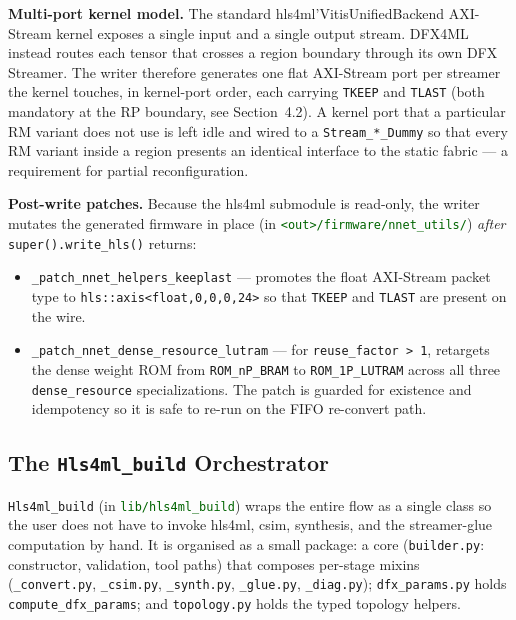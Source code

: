 \documentclass{cernatsnote}
\begin{document}
\noindent\textbf{Multi-port kernel model.}
The standard hls4ml'VitisUnifiedBackend AXI-Stream kernel exposes a single input and a single output stream.
DFX4ML instead routes each tensor that crosses a region boundary through its
own DFX Streamer. The writer therefore generates one flat AXI-Stream port per
streamer the kernel touches, in kernel-port order, each carrying \texttt{TKEEP} and
\texttt{TLAST} (both mandatory at the RP boundary, see Section~4.2). A kernel port
that a particular RM variant does not use is left idle and wired to a
\texttt{Stream\_*\_Dummy} so that every RM variant inside a region presents an
identical interface to the static fabric --- a requirement for partial
reconfiguration.

\noindent\textbf{Post-write patches.}
Because the hls4ml submodule is read-only, the writer mutates the generated
firmware in place (in \textcolor{darkgreen}{\texttt{<out>/firmware/nnet\_utils/}})
\emph{after} \texttt{super().write\_hls()} returns:
\begin{itemize}
  \item \texttt{\_patch\_nnet\_helpers\_keeplast} --- promotes the float AXI-Stream
        packet type to \texttt{hls::axis<float,0,0,0,24>} so that \texttt{TKEEP} and
        \texttt{TLAST} are present on the wire.
  \item \texttt{\_patch\_nnet\_dense\_resource\_lutram} --- for
        \texttt{reuse\_factor > 1}, retargets the dense weight ROM from
        \texttt{ROM\_nP\_BRAM} to \texttt{ROM\_1P\_LUTRAM} across all three
        \texttt{dense\_resource} specializations. The patch is guarded for
        existence and idempotency so it is safe to re-run on the FIFO re-convert
        path.
\end{itemize}

\subsection{The \texttt{Hls4ml\_build} Orchestrator}

\texttt{Hls4ml\_build} (in \textcolor{darkgreen}{\texttt{lib/hls4ml\_build}}) wraps
the entire flow as a single class so the user does not have to invoke hls4ml,
csim, synthesis, and the streamer-glue computation by hand. It is organised as a
small package: a core (\texttt{builder.py}: constructor, validation, tool paths)
that composes per-stage mixins (\texttt{\_convert.py}, \texttt{\_csim.py},
\texttt{\_synth.py}, \texttt{\_glue.py}, \texttt{\_diag.py}); \texttt{dfx\_params.py}
holds \texttt{compute\_dfx\_params}; and \texttt{topology.py} holds the typed
topology helpers.
\end{document}
